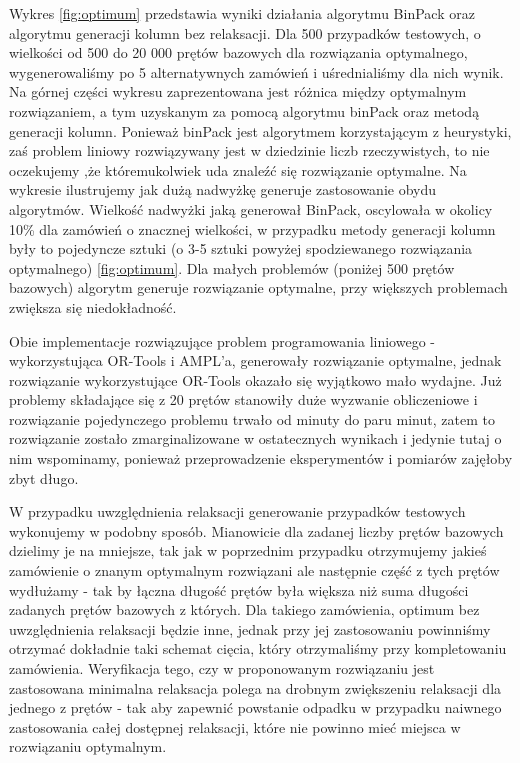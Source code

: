  Wykres \ref{fig:optimum} przedstawia wyniki działania algorytmu BinPack oraz algorytmu generacji kolumn bez relaksacji. Dla 500 przypadków testowych, o wielkości od 500 do 20 000 prętów bazowych dla rozwiązania optymalnego, wygenerowaliśmy po 5 alternatywnych zamówień i uśrednialiśmy dla nich wynik. Na górnej części wykresu zaprezentowana jest różnica między optymalnym rozwiązaniem, a tym uzyskanym za pomocą algorytmu binPack oraz metodą generacji kolumn. Ponieważ binPack jest algorytmem korzystającym z heurystyki, zaś problem liniowy rozwiązywany jest w dziedzinie liczb rzeczywistych, to nie oczekujemy ,że któremukolwiek uda znaleźć się rozwiązanie optymalne. Na wykresie ilustrujemy jak dużą nadwyżkę generuje zastosowanie obydu algorytmów. Wielkość nadwyżki jaką generował BinPack, oscylowała w okolicy 10\% dla zamówień o znacznej wielkości, w przypadku metody generacji kolumn były to pojedyncze sztuki (o 3-5 sztuki powyżej spodziewanego rozwiązania optymalnego) \ref{fig:optimum}. Dla małych problemów (poniżej 500 prętów bazowych) algorytm generuje rozwiązanie optymalne, przy większych problemach zwiększa się niedokładność.
 
 Obie implementacje rozwiązujące problem programowania liniowego - wykorzystująca OR-Tools i AMPL'a, generowały rozwiązanie optymalne, jednak rozwiązanie wykorzystujące OR-Tools okazało się wyjątkowo mało wydajne. Już problemy składające się z 20 prętów stanowiły duże wyzwanie obliczeniowe i rozwiązanie pojedynczego problemu trwało od minuty do paru minut, zatem to rozwiązanie zostało zmarginalizowane w ostatecznych wynikach i jedynie tutaj o nim wspominamy, ponieważ przeprowadzenie eksperymentów i pomiarów zajęłoby zbyt długo.

W przypadku uwzględnienia relaksacji generowanie przypadków testowych wykonujemy w podobny sposób. Mianowicie dla zadanej liczby prętów bazowych dzielimy je na mniejsze, tak jak w poprzednim przypadku otrzymujemy jakieś zamówienie o znanym optymalnym rozwiązani ale następnie część z tych prętów wydłużamy - tak by łączna długość prętów była większa niż suma długości zadanych prętów bazowych z których. Dla takiego zamówienia, optimum bez uwzględnienia relaksacji będzie inne, jednak przy jej zastosowaniu powinniśmy otrzymać dokładnie taki schemat cięcia, który otrzymaliśmy przy kompletowaniu zamówienia. Weryfikacja tego, czy w proponowanym rozwiązaniu jest zastosowana minimalna relaksacja polega na drobnym zwiększeniu relaksacji dla jednego z prętów - tak aby zapewnić powstanie odpadku w przypadku naiwnego zastosowania całej dostępnej relaksacji, które nie powinno mieć miejsca w rozwiązaniu optymalnym.

